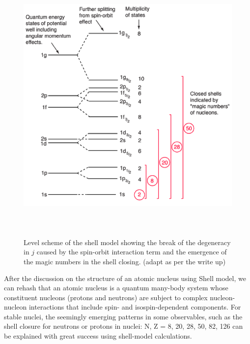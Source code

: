 \documentclass[a4paper,12pt,twoside]{report}
\begin{document}
 
 \begin{figure}[h!]
    \centering
    \includegraphics[width=15cm,height=14cm]{shell_structure.png}
    \caption[shell structure]{Level scheme of the shell model showing the break of the degeneracy in $\textit{j}$ caused by the spin-orbit interaction term and the emergence of the magic numbers in the shell closing. (adapt as per the write up)}
    \label{fig:shell_structure}
\end{figure}
After the discussion on the structure of an atomic nucleus using Shell model, we can rehash that an atomic nucleus is a quantum many-body system whose constituent nucleons (protons and neutrons) are subject to complex nucleon-nucleon interactions that include spin- and isospin-dependent components. For stable nuclei, the seemingly emerging patterns in some observables, such as the shell closure for neutrons or protons in nuclei: N, Z = 8, 20, 28, 50, 82, 126 can be explained with great success using shell-model calculations. 
\end{document}
